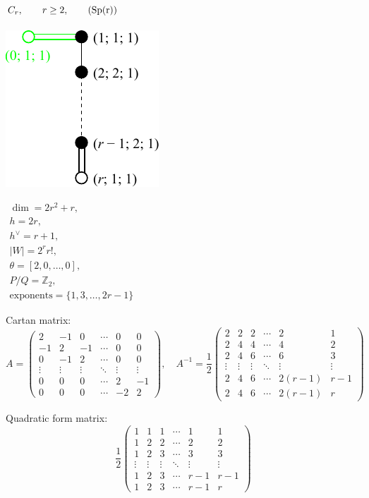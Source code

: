 \documentclass[12pt]{article}
\newcommand{\Zb}{\mathbb{Z}}
\newcommand{\Sp}{\rm Sp}
\newcommand{\hc}{h^{\vee}}
\begin{document}
\subsection*{$C_r,\qquad r\ge 2,\qquad (\Sp(r))$}
\parbox{8cm}{\includegraphics{lie_C.pdf}}
$
\begin{array}{l}
 \dim = 2r^2+r, \\
  h= 2r,\\
 \hc= r+1,\\
 |W|=2^r r!,\\
 \theta=[2,0,\dots,0],\\
 P/Q=\Zb_2,\\
 \text{exponents}={\{1,3,\dots,2r-1\}}
\end{array}
$

Cartan matrix:
\[
A=\left(
\begin{array}{cccccc}
 2 & -1& 0 &\cdots & 0 & 0 \\
 -1& 2 & -1 &\cdots & 0 & 0 \\
 0 & -1 & 2 &\cdots & 0 & 0 \\
  \vdots&\vdots &\vdots &\ddots &\vdots &\vdots \\
 0&0 &0 &\cdots & 2& -1\\
 0&0 &0 &\cdots & -2& 2
\end{array}
\right)
,\quad
A^{-1}=\frac{1}{2}
\left(
\begin{array}{cccccc}
 2& 2& 2 &\cdots & 2 & 1 \\
 2& 4 & 4 &\cdots & 4 & 2 \\
 2& 4 & 6 &\cdots & 6 & 3 \\
  \vdots&\vdots &\vdots &\ddots &\vdots &\vdots \\
 2&4 &6 &\cdots & 2(r-1)& r-1\\
 2&4 &6 &\cdots & 2(r-1)& r
\end{array}
\right)
\]

Quadratic form matrix:
\[\frac{1}{2}
\left(
\begin{array}{cccccc}
 1& 1& 1 &\cdots & 1 & 1 \\
 1& 2 & 2 &\cdots & 2 & 2 \\
 1& 2 & 3 &\cdots & 3 & 3 \\
  \vdots&\vdots &\vdots &\ddots &\vdots &\vdots \\
 1&2 &3 &\cdots & r-1& r-1\\
 1&2 &3 &\cdots & r-1& r
\end{array}
\right)
\]
\end{document}
